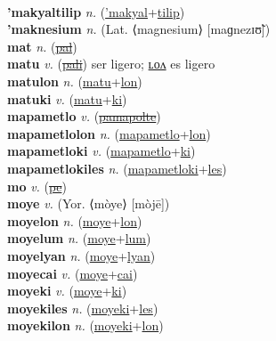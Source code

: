  \label{'makyaltec} \\
\textbf{'makyaltilip} \textit{n.} (\hyperref['makyal]{'makyal}+\hyperref[tilip]{tilip})
 \label{'makyaltilip} \\
\textbf{'maknesium} \textit{n.} (Lat. ⟨magnesium⟩ [maɡnezɪʊ̃])
 \label{'maknesium} \\
\textbf{mat} \textit{n.} (\hyperref[pal]{\sout{pal}})
 \label{mat} \\
\textbf{matu} \textit{v.} (\hyperref[pali]{\sout{pali}})
ser ligero; \hyperref[matulon]{ʟᴏᴧ} es ligero \label{matu} \\
\textbf{matulon} \textit{n.} (\hyperref[matu]{matu}+\hyperref[lon]{lon})
 \label{matulon} \\
\textbf{matuki} \textit{v.} (\hyperref[matu]{matu}+\hyperref[ki]{ki})
 \label{matuki} \\
\textbf{mapametlo} \textit{v.} (\hyperref[pamapolte]{\sout{pamapolte}})
 \label{mapametlo} \\
\textbf{mapametlolon} \textit{n.} (\hyperref[mapametlo]{mapametlo}+\hyperref[lon]{lon})
 \label{mapametlolon} \\
\textbf{mapametloki} \textit{v.} (\hyperref[mapametlo]{mapametlo}+\hyperref[ki]{ki})
 \label{mapametloki} \\
\textbf{mapametlokiles} \textit{n.} (\hyperref[mapametloki]{mapametloki}+\hyperref[les]{les})
 \label{mapametlokiles} \\
\textbf{mo} \textit{v.} (\hyperref[pe]{\sout{pe}})
 \label{mo} \\
\textbf{moye} \textit{v.} (Yor. ⟨mòye⟩ [mòjē])
 \label{moye} \\
\textbf{moyelon} \textit{n.} (\hyperref[moye]{moye}+\hyperref[lon]{lon})
 \label{moyelon} \\
\textbf{moyelum} \textit{n.} (\hyperref[moye]{moye}+\hyperref[lum]{lum})
 \label{moyelum} \\
\textbf{moyelyan} \textit{n.} (\hyperref[moye]{moye}+\hyperref[lyan]{lyan})
 \label{moyelyan} \\
\textbf{moyecai} \textit{v.} (\hyperref[moye]{moye}+\hyperref[cai]{cai})
 \label{moyecai} \\
\textbf{moyeki} \textit{v.} (\hyperref[moye]{moye}+\hyperref[ki]{ki})
 \label{moyeki} \\
\textbf{moyekiles} \textit{n.} (\hyperref[moyeki]{moyeki}+\hyperref[les]{les})
 \label{moyekiles} \\
\textbf{moyekilon} \textit{n.} (\hyperref[moyeki]{moyeki}+\hyperref[lon]{lon})
 \label{moyekilon} \\
